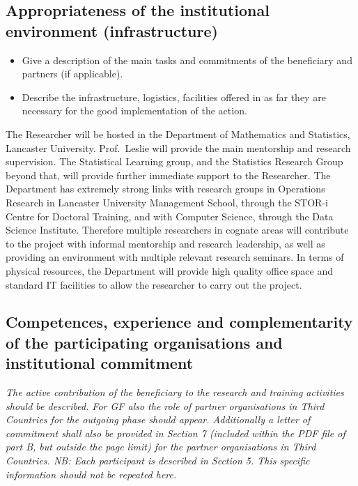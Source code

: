 \documentclass[a4paper,11pt]{article}
\begin{document}
\begin{figure}[htbp]
\begin{center}
\end{center}
\end{figure}

\subsection{Appropriateness of the institutional environment (infrastructure)}
\label{sec:institution}

{\em
\begin{itemize}
\item Give a description of the main tasks and commitments of the beneficiary and partners (if applicable).
\item Describe the infrastructure, logistics, facilities offered in as far they are necessary for the good implementation of the action.
\end{itemize}
}

The Researcher will be hosted in the Department of Mathematics and Statistics, Lancaster University.  Prof.\ Leslie will provide the main mentorship and research supervision.  The Statistical Learning group, and the Statistics Research Group beyond that, will provide further immediate support to the Researcher.  The Department has extremely strong links with research groups in Operations Research in Lancaster University Management School, through the STOR-i Centre for Doctoral Training, and with Computer Science, through the Data Science Institute.  Therefore multiple researchers in cognate areas will contribute to the project with informal mentorship and research leadership, as well as providing an environment with multiple relevant research seminars.  In terms of physical resources, the Department will provide high quality office space and standard IT facilities to allow the researcher to carry out the project.


\subsection{Competences, experience and complementarity of the participating organisations and institutional commitment}
\label{sec:competences}


{\em
The active contribution of the beneficiary to the research and training activities should be described. For GF also the role of partner organisations in Third Countries for the outgoing phase should appear. Additionally a letter of commitment shall also be provided in Section 7 (included within the PDF file of part B, but outside the page limit) for the partner organisations in Third Countries.
NB: Each participant is described in Section 5. This specific information should not be repeated here.
}
\end{document}
